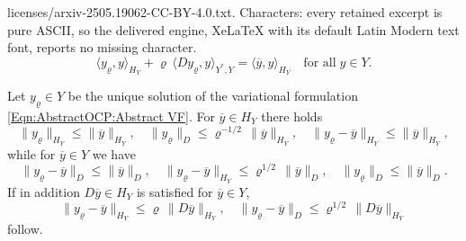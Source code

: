 \documentclass[10pt,a4paper]{amsart}
\begin{document}
licenses/arxiv-2505.19062-CC-BY-4.0.txt. Characters: every retained excerpt is pure ASCII, so the delivered engine, XeLaTeX with its default Latin Modern text font, reports no missing character.
\begin{equation}\label{Eqn:AbstractOCP:Abstract VF}
  \langle y_\varrho , y \rangle_{H_Y} +
  \varrho \, \langle D y_\varrho , y  \rangle_{Y^*,Y} =
  \langle \overline{y} , y \rangle_{H_Y} \quad
  \mbox{for all} \; y \in Y .
\end{equation}

\begin{lemma}\label{Lemma:AbstractOCP:RegularizationErrorUnconstrained}
  Let $y_\varrho \in Y$ be the unique solution of the variational formulation
  \eqref{Eqn:AbstractOCP:Abstract VF}. For $\overline{y} \in H_Y$ there holds
  \[
    \| y_\varrho \|_{H_Y} \leq \| \overline{y} \|_{H_Y}, \quad
    \| y_\varrho \|_D \leq \varrho^{-1/2} \, \| \overline{y} \|_{H_Y}, \quad
    \| y_\varrho - \overline{y} \|_{H_Y} \leq \| \overline{y} \|_{H_Y}, 
  \]
  while for $\overline{y} \in Y$ we have
  \[
    \| y_\varrho - \overline{y} \|_D \leq \| \overline{y} \|_D , \quad
    \| y_\varrho - \overline{y} \|_{H_Y} \leq \varrho^{1/2} \,
    \| \overline{y} \|_D , \quad
    \| y_\varrho \|_D \leq \| \overline{y} \|_D .
  \]
  If in addition $D \overline{y} \in H_Y$ is satisfied for
  $\overline{y} \in Y$,
  \[
    \| y_\varrho - \overline{y} \|_{H_Y} \leq
    \varrho \, \| D \overline{y} \|_{H_Y}, \quad
    \| y_\varrho - \overline{y} \|_D \leq \varrho^{1/2} \,
    \| D \overline{y} \|_{H_Y} 
  \]
  follow.
\end{lemma}
\end{document}
